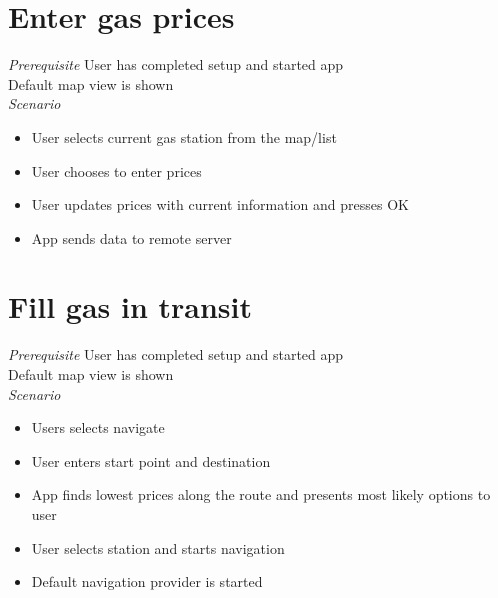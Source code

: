 \section{Enter gas prices}
\emph{Prerequisite} User has completed setup and started app\\
Default map view is shown \\

\emph{Scenario}
\begin{itemize}
	\item User selects current gas station from the map/list
\item User chooses to enter prices
\item User updates prices with current information and presses OK
\item App sends data to remote server
\end{itemize}

\section{Fill gas in transit}
\emph{Prerequisite} User has completed setup and started app\\
Default map view is shown\\

\emph{Scenario}
\begin{itemize}
	\item Users selects navigate
\item User enters start point and destination
\item App finds lowest prices along the route and presents most likely options to user
\item User selects station and starts navigation
\item Default navigation provider is started

\end{itemize}


